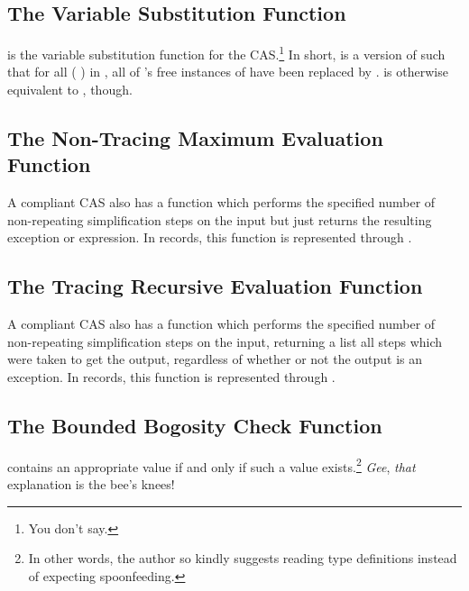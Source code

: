\documentclass{report}
\begin{document}
\subsection{The Variable Substitution Function}
  is the variable substitution function for the  CAS.\footnote{You don't say.}
In short,     is a version of  such that for all \AgdaSymbol( \AgdaOperator{\AgdaInductiveConstructor{,}} \AgdaSymbol) in , all of 's free instances of   have been replaced by .      is otherwise equivalent to , though.

\subsection{The Non-Tracing Maximum Evaluation Function}
A compliant CAS also has a function which performs the specified number of non-repeating simplification steps on the input but just returns the resulting exception or expression.  In  records, this function is represented through .

\subsection{The Tracing Recursive Evaluation Function}
A compliant CAS also has a function which performs the specified number of non-repeating simplification steps on the input, returning a list all steps which were taken to get the output, regardless of whether or not the output is an exception.  In  records, this function is represented through .

\subsection{The Bounded Bogosity Check Function}
    contains an appropriate value if and only if such a value exists.\footnote{In other words, the author so kindly suggests reading type definitions instead of expecting spoonfeeding.}  \emph{Gee}, \emph{that} explanation is the bee's knees!
\end{document}
